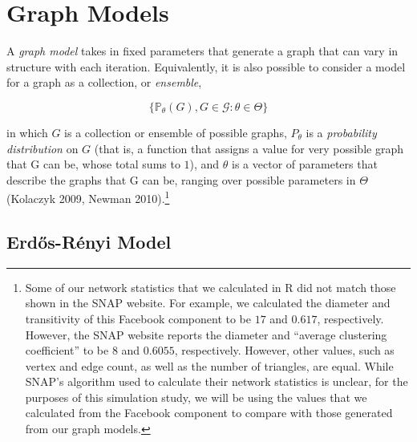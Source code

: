 \documentclass[12pt,twoside]{amherstthesis}
\begin{document}
  \chapter{Graph Models}\label{graph-models}
  
  A \emph{graph model} takes in fixed parameters that generate a graph
  that can vary in structure with each iteration. Equivalently, it is also
  possible to consider a model for a graph as a collection, or
  \emph{ensemble},
  
  \[\{\mathbb{P}_{\theta}(G), G \in \mathcal{G}: \theta \in \Theta\}\]
  
  in which \(G\) is a collection or ensemble of possible graphs,
  \(P_\theta\) is a \emph{probability distribution} on \(G\) (that is, a
  function that assigns a value for very possible graph that G can be,
  whose total sums to \(1\)), and \(\theta\) is a vector of parameters
  that describe the graphs that G can be, ranging over possible parameters
  in \(\Theta\) (Kolaczyk 2009, Newman 2010).\footnote{Some of our network
    statistics that we calculated in R did not match those shown in the
    SNAP website. For example, we calculated the diameter and transitivity
    of this Facebook component to be \(17\) and \(0.617\), respectively.
    However, the SNAP website reports the diameter and ``average
    clustering coefficient'' to be \(8\) and \(0.6055\), respectively.
    However, other values, such as vertex and edge count, as well as the
    number of triangles, are equal. While SNAP's algorithm used to
    calculate their network statistics is unclear, for the purposes of
    this simulation study, we will be using the values that we calculated
    from the Facebook component to compare with those generated from our
    graph models.}
  
  \section{Erdős-Rényi Model}\label{erdos-renyi-model}
  
\end{document}

